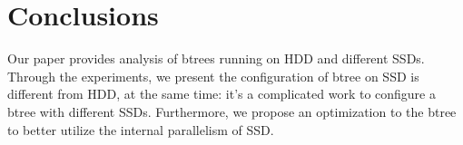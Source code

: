 
\section{Conclusions}
Our paper provides analysis of btrees running on HDD and different SSDs. Through the experiments, we present the configuration of btree on SSD is different from HDD, at the same time: it's a complicated work to configure a btree with different SSDs.
Furthermore, we propose an optimization to the btree to better utilize the internal parallelism of SSD. 

